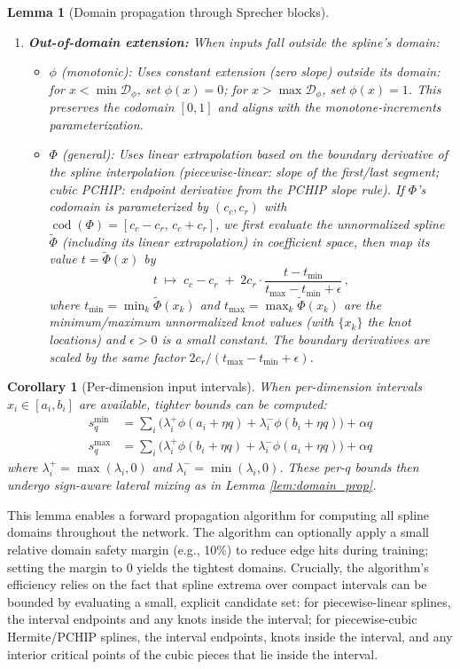 \documentclass{article}
\theoremstyle{plain}
\newtheorem{lemma}{Lemma}
\newtheorem{corollary}{Corollary}
\theoremstyle{definition}
\theoremstyle{remark}
\begin{document}
\begin{lemma}[Domain propagation through Sprecher blocks]
\begin{enumerate}
\item \textbf{Out-of-domain extension:} When inputs fall outside the spline's domain:
   \begin{itemize}
   \item $\phi$ (monotonic): Uses \emph{constant} extension (zero slope) outside its domain: for $x<\min\mathcal{D}_\phi$, set $\phi(x)=0$; for $x>\max\mathcal{D}_\phi$, set $\phi(x)=1$. This preserves the codomain $[0,1]$ and aligns with the monotone-increments parameterization.
   \item $\Phi$ (general): Uses \emph{linear} extrapolation based on the boundary \emph{derivative} of the spline interpolation (piecewise-linear: slope of the first/last segment; cubic \textsc{PCHIP}: endpoint derivative from the \textsc{PCHIP} slope rule). If $\Phi$'s codomain is parameterized by $(c_c,c_r)$ with $\operatorname{cod}(\Phi)=[c_c-c_r,\,c_c+c_r]$, we first evaluate the \emph{unnormalized} spline $\tilde{\Phi}$ (including its linear extrapolation) in coefficient space, then map its value $t=\tilde{\Phi}(x)$ by
   $$t \;\mapsto\; c_c - c_r \;+\; 2c_r \cdot \frac{t - t_{\min}}{t_{\max}-t_{\min}+\epsilon}\,,$$
   where $t_{\min}=\min_k \tilde{\Phi}(x_k)$ and $t_{\max}=\max_k \tilde{\Phi}(x_k)$ are the minimum/maximum unnormalized knot values (with $\{x_k\}$ the knot locations) and $\epsilon>0$ is a small constant. The boundary derivatives are scaled by the same factor $2c_r/(t_{\max}-t_{\min}+\epsilon)$.
   \end{itemize}
\end{enumerate}
\end{lemma}

\begin{corollary}[Per-dimension input intervals]
When per-dimension intervals $x_i \in [a_i, b_i]$ are available, tighter bounds can be computed:
$$\begin{aligned}
s_q^{\min} &= \sum_i \bigl(\lambda_i^+ \phi(a_i + \eta q) + \lambda_i^- \phi(b_i + \eta q)\bigr) + \alpha q\\
s_q^{\max} &= \sum_i \bigl(\lambda_i^+ \phi(b_i + \eta q) + \lambda_i^- \phi(a_i + \eta q)\bigr) + \alpha q
\end{aligned}$$
where $\lambda_i^+ = \max(\lambda_i, 0)$ and $\lambda_i^- = \min(\lambda_i, 0)$. These per-$q$ bounds then undergo sign-aware lateral mixing as in Lemma \ref{lem:domain_prop}.
\end{corollary}

This lemma enables a forward propagation algorithm for computing all spline domains throughout the network. The algorithm can optionally apply a small relative domain safety margin (e.g., 10\%) to reduce edge hits during training; setting the margin to 0 yields the tightest domains. Crucially, the algorithm's efficiency relies on the fact that spline extrema over compact intervals can be bounded by evaluating a small, explicit candidate set: for piecewise-linear splines, the interval endpoints and any knots inside the interval; for piecewise-cubic Hermite/\textsc{PCHIP} splines, the interval endpoints, knots inside the interval, and any interior critical points of the cubic pieces that lie inside the interval.
\end{document}
